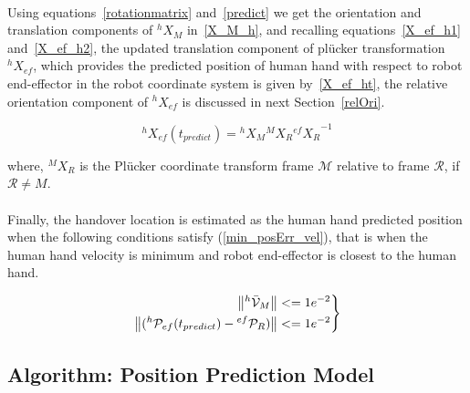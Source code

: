 \documentclass[a4paper, 12pt, oneside]{Thesis}  %
\begin{document}
\paragraph*{}
Using equations~\ref{rotationmatrix} and~\ref{predict} we get the orientation and translation components of ${}^{h}{X}_M$ in~\ref{X_M_h}, and recalling equations~\ref{X_ef_h1} and~\ref{X_ef_h2}, the updated translation component of pl\"ucker transformation ${}^{h}{X}_{ef}$, which provides the predicted position of human hand with respect to robot end-effector in the robot coordinate system is given by~\ref{X_ef_ht}, the relative orientation component of ${}^{h}{X}_{ef}$ is discussed in next Section~\ref{relOri}.

\begin{equation}\label{X_ef_ht}
{}^{h}{X}_{ef}(t_{predict}) =  {}^{h}{X}_M  {}^{M}{X}_R {{}^{ef}{X}_R}^{-1}
\end{equation}

where, ${}^{M}{X}_R$ is the Pl\"ucker coordinate transform frame $\mathcal{M}$ relative to frame $\mathcal{R}$, if $\mathcal R \neq M$.

\paragraph*{}
Finally, the handover location is estimated as the human hand predicted position when the following conditions satisfy (\ref{min_posErr_vel}), that is when the human hand velocity is minimum and robot end-effector is closest to the human hand.

\begin{equation}\label{min_posErr_vel}
\left.\begin{aligned}
\norm{{}^{h}\mathcal{\bar{V}}_{M}}& <= 1e^{-2} \\
\norm{({}^{h}\mathcal{P}_{ef}(t_{predict}) - {}^{ef}\mathcal{P}_{R})} & <= 1e^{-2}
\end{aligned}
\right\}
\end{equation}


\subsection{Algorithm: Position Prediction Model}
\end{document}
